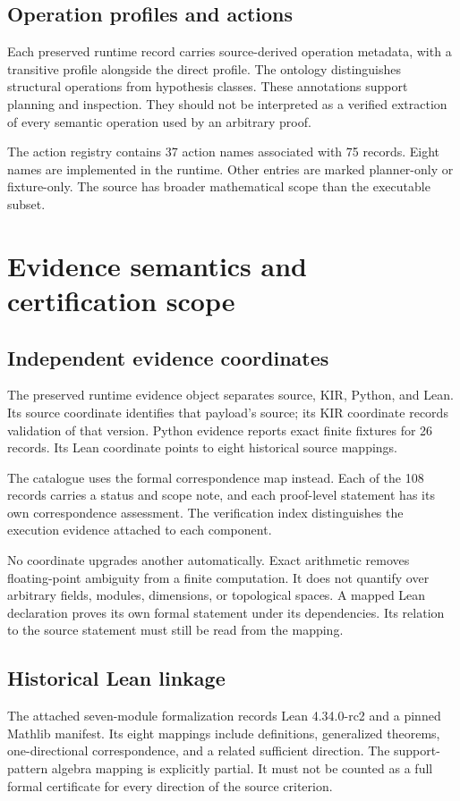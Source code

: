 \documentclass[a4paper,11pt]{article}
\begin{document}
\subsection{Operation profiles and actions}
Each preserved runtime record carries source-derived operation metadata, with a transitive profile alongside the direct profile. The ontology distinguishes structural operations from hypothesis classes. These annotations support planning and inspection. They should not be interpreted as a verified extraction of every semantic operation used by an arbitrary proof.

The action registry contains 37 action names associated with 75 records. Eight names are implemented in the runtime. Other entries are marked planner-only or fixture-only. The source has broader mathematical scope than the executable subset.

\section{Evidence semantics and certification scope}
\subsection{Independent evidence coordinates}
The preserved runtime evidence object separates source, KIR, Python, and Lean. Its source coordinate identifies that payload's source; its KIR coordinate records validation of that version. Python evidence reports exact finite fixtures for 26 records. Its Lean coordinate points to eight historical source mappings.

The catalogue uses the formal correspondence map instead. Each of the 108 records carries a status and scope note, and each proof-level statement has its own correspondence assessment. The verification index distinguishes the execution evidence attached to each component.

No coordinate upgrades another automatically. Exact arithmetic removes floating-point ambiguity from a finite computation. It does not quantify over arbitrary fields, modules, dimensions, or topological spaces. A mapped Lean declaration proves its own formal statement under its dependencies. Its relation to the source statement must still be read from the mapping.


\subsection{Historical Lean linkage}
The attached seven-module formalization records Lean 4.34.0-rc2 and a pinned Mathlib manifest. Its eight mappings include definitions, generalized theorems, one-directional correspondence, and a related sufficient direction. The support-pattern algebra mapping is explicitly partial. It must not be counted as a full formal certificate for every direction of the source criterion.
\end{document}
